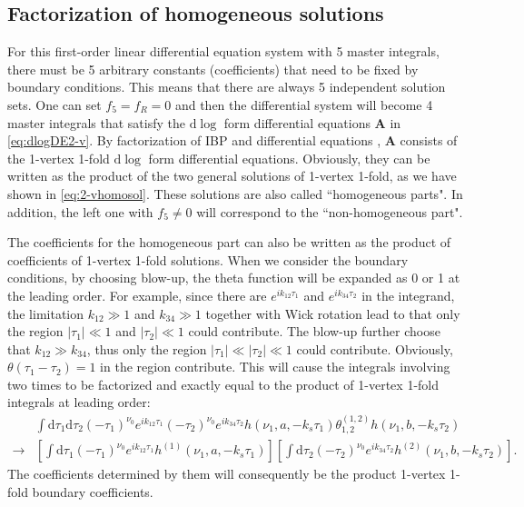 \documentclass[a4paper,11pt]{article}
\newcommand{\nd}{\mathrm{d}}
\def\ie{\begin{equation}\begin{aligned}}
\def\fe{\end{aligned}\end{equation}}
\begin{document}
\subsection{Factorization of homogeneous solutions}\label{sec:2-vfactoriztion}


For this first-order linear differential equation system with 5 master integrals, there must be 5 arbitrary constants (coefficients) that need to be fixed by boundary conditions. This means that there are always 5 independent solution sets. One can set $f_5=f_R=0$ and then the differential system will become 4 master integrals that satisfy the $\nd \log$ form differential equations \textbf{A} in \eqref{eq:dlogDE2-v}. By factorization of IBP and differential equations \cite{Chen:2023iix}, \textbf{A} consists of the 1-vertex 1-fold $\nd \log$ form differential equations. Obviously, they can be written as the product of the two general solutions of 1-vertex 1-fold, as we have shown in \eqref{eq:2-vhomosol}.  These solutions are also called ``homogeneous parts". In addition, the left one with $f_5\neq0$ will correspond to the ``non-homogeneous part". 

The coefficients for the homogeneous part can also be written as the product of coefficients of 1-vertex 1-fold solutions. When we consider the boundary conditions, by choosing blow-up, the theta function will be expanded as 0 or 1 at the leading order. For example, since there are $e^{i k_{12} \tau_1}$  and $e^{i k_{34} \tau_2}$ in the integrand, the limitation $k_{12}\gg 1$ and $k_{34}\gg 1$ together with Wick rotation lead to that only the region $|\tau_1|\ll 1$ and $|\tau_2|\ll 1$ could contribute. The blow-up further choose that $k_{12}\gg k_{34}$, thus only the region $|\tau_1|\ll |\tau_2|\ll 1$ could contribute. Obviously,  $\theta(\tau_1-\tau_2)=1$ in the region contribute. This will cause the integrals involving two times to be factorized and exactly equal to the product of 1-vertex 1-fold integrals at leading order: 
\ie
&\int \nd \tau_1\nd \tau_2(-\tau_1)^{\nu_{0}}e^{ik_{12}\tau_1}(-\tau_2)^{\nu_{0}}e^{ik_{34}\tau_2}h(\nu_1,a,-k_s\tau_1) \theta_{1,2}^{(1,2)} h(\nu_1,b,-k_s\tau_2)\\
\longrightarrow &\left[\int \nd \tau_1(-\tau_1)^{\nu_{0}}e^{ik_{12}\tau_1}h^{(1)}(\nu_1,a,-k_s\tau_1)\right]\left[\int \nd \tau_2(-\tau_2)^{\nu_{0}}e^{ik_{34}\tau_2} h^{(2)}(\nu_1,b,-k_s\tau_2)\right].
\fe
The coefficients determined by them will consequently be the product 1-vertex 1-fold boundary coefficients. 
\end{document}
